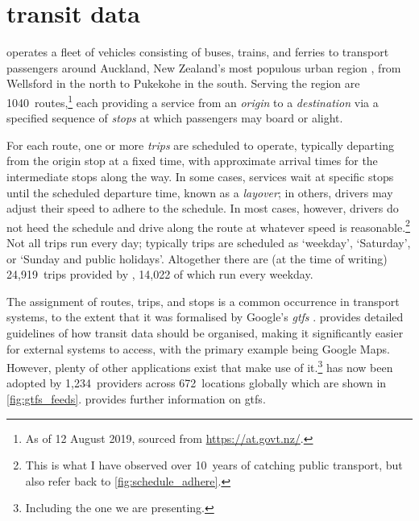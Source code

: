 \chapter{\Rt{} transit data}
\label{cha:data}



\AT{} operates a fleet of vehicles consisting of buses, trains, and ferries to transport passengers around Auckland, New Zealand's most populous urban region \citep{StatsNZ_2019}, from Wellsford in the north to Pukekohe in the south. Serving the region are 1040~routes,\footnote{As of 12 August 2019, sourced from \url{https://at.govt.nz/}.} each providing a service from an \emph{origin} to a \emph{destination} via a specified sequence of \emph{stops} at which passengers may board or alight.


For each route, one or more \emph{trips} are scheduled to operate, typically departing from the origin stop at a fixed time, with approximate arrival times for the intermediate stops along the way. In some cases, services wait at specific stops until the scheduled departure time, known as a \emph{layover}; in others, drivers may adjust their speed to adhere to the schedule. In most cases, however, drivers do not heed the schedule and drive along the route at whatever speed is reasonable.\footnote{This is what I have observed over 10~years of catching public transport, but also refer back to \cref{fig:schedule_adhere}.} Not all trips run every day; typically trips are scheduled as `weekday', `Saturday', or `Sunday and public holidays'. Altogether there are (at the time of writing) 24,919~trips provided by \AT{}, 14,022 of which run every weekday.


The assignment of routes, trips, and stops is a common occurrence in transport systems, to the extent that it was formalised by Google's \emph{\acrfull{gtfs}} \citep {GoogleDevelopers_2006}. \GTFS{} provides detailed guidelines of how transit data should be organised, making it significantly easier for external systems to access, with the primary example being Google Maps. However, plenty of other applications exist that make use of it.\footnote{Including the one we are presenting.} \GTFS{} has now been adopted by 1,234~providers across 672~locations globally which are shown in \cref{fig:gtfs_feeds}.  provides further information on \gls{gtfs}.


